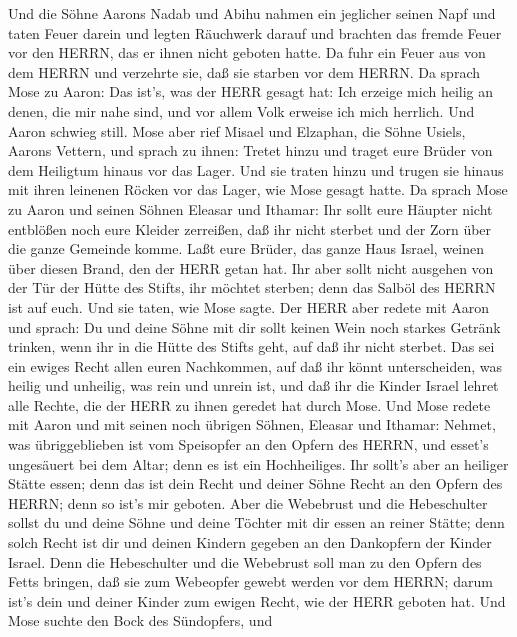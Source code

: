  Und die Söhne Aarons Nadab und Abihu nahmen ein jeglicher
seinen Napf und taten Feuer darein und legten Räuchwerk darauf und
brachten das fremde Feuer vor den HERRN, das er ihnen nicht geboten
hatte.  Da fuhr ein Feuer aus von dem HERRN und verzehrte
sie, daß sie starben vor dem HERRN.  Da sprach Mose zu
Aaron: Das ist's, was der HERR gesagt hat: Ich erzeige mich heilig an
denen, die mir nahe sind, und vor allem Volk erweise ich mich herrlich.
Und Aaron schwieg still.  Mose aber rief Misael und
Elzaphan, die Söhne Usiels, Aarons Vettern, und sprach zu ihnen: Tretet
hinzu und traget eure Brüder von dem Heiligtum hinaus vor das Lager.
 Und sie traten hinzu und trugen sie hinaus mit ihren
leinenen Röcken vor das Lager, wie Mose gesagt hatte.  Da
sprach Mose zu Aaron und seinen Söhnen Eleasar und Ithamar: Ihr sollt
eure Häupter nicht entblößen noch eure Kleider zerreißen, daß ihr nicht
sterbet und der Zorn über die ganze Gemeinde komme. Laßt eure Brüder,
das ganze Haus Israel, weinen über diesen Brand, den der HERR getan hat.
 Ihr aber sollt nicht ausgehen von der Tür der Hütte des
Stifts, ihr möchtet sterben; denn das Salböl des HERRN ist auf euch. Und
sie taten, wie Mose sagte.  Der HERR aber redete mit Aaron
und sprach:  Du und deine Söhne mit dir sollt keinen Wein
noch starkes Getränk trinken, wenn ihr in die Hütte des Stifts geht, auf
daß ihr nicht sterbet. Das sei ein ewiges Recht allen euren Nachkommen,
 auf daß ihr könnt unterscheiden, was heilig und unheilig,
was rein und unrein ist,  und daß ihr die Kinder Israel
lehret alle Rechte, die der HERR zu ihnen geredet hat durch Mose.
 Und Mose redete mit Aaron und mit seinen noch übrigen
Söhnen, Eleasar und Ithamar: Nehmet, was übriggeblieben ist vom
Speisopfer an den Opfern des HERRN, und esset's ungesäuert bei dem
Altar; denn es ist ein Hochheiliges.  Ihr sollt's aber an
heiliger Stätte essen; denn das ist dein Recht und deiner Söhne Recht an
den Opfern des HERRN; denn so ist's mir geboten.  Aber die
Webebrust und die Hebeschulter sollst du und deine Söhne und deine
Töchter mit dir essen an reiner Stätte; denn solch Recht ist dir und
deinen Kindern gegeben an den Dankopfern der Kinder Israel.
 Denn die Hebeschulter und die Webebrust soll man zu den
Opfern des Fetts bringen, daß sie zum Webeopfer gewebt werden vor dem
HERRN; darum ist's dein und deiner Kinder zum ewigen Recht, wie der HERR
geboten hat.  Und Mose suchte den Bock des Sündopfers, und
